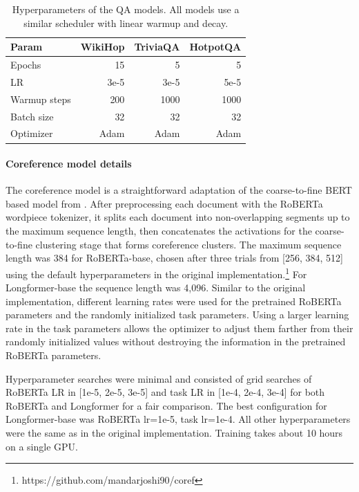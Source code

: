 \documentclass[11pt,a4paper]{article}
\newcommand{\model}{Longformer\xspace}
\begin{document}
\begin{table}[!h]
 \centering
 \small
\begin{tabular}{@{}lrrr@{}}
\toprule
Param & WikiHop & TriviaQA & HotpotQA \\
\midrule
Epochs & 15 & 5 & 5 \\
LR & 3e-5 & 3e-5 & 5e-5\\
Warmup steps & 200 & 1000 & 1000 \\
Batch size & 32 & 32 & 32 \\
Optimizer & Adam & Adam & Adam \\
\bottomrule
\end{tabular}
\caption{Hyperparameters of the QA models. All models use a similar scheduler with linear warmup and decay.}
\label{tab:qa-hyperparams}
 \end{table}

\paragraph{Coreference model details}
The coreference model is a straightforward adaptation of the coarse-to-fine BERT based model from \citet{joshi-etal-2019-bert}.  After preprocessing each document with the RoBERTa wordpiece tokenizer, it splits each document into non-overlapping segments up to the maximum sequence length, then concatenates the activations for the coarse-to-fine clustering stage that forms coreference clusters.
The maximum sequence length was 384 for RoBERTa-base, chosen after three trials from [256, 384, 512] using the default hyperparameters in the original  implementation.\footnote{https://github.com/mandarjoshi90/coref}  For \model-base the sequence length was 4,096.  Similar to the original implementation, different learning rates were used for the pretrained RoBERTa parameters and the randomly initialized task parameters.  Using a larger learning rate in the task parameters allows the optimizer to adjust them farther from their randomly initialized values without destroying the information in the pretrained RoBERTa parameters.  

Hyperparameter searches were minimal and consisted of grid searches of RoBERTa LR in [1e-5, 2e-5, 3e-5] and task LR in [1e-4, 2e-4, 3e-4] for both RoBERTa and \model for a fair comparison. The best configuration for \model-base was RoBERTa lr=1e-5, task lr=1e-4.  All other hyperparameters were the same as in the original implementation.  Training takes about 10 hours on a single GPU.
\end{document}
